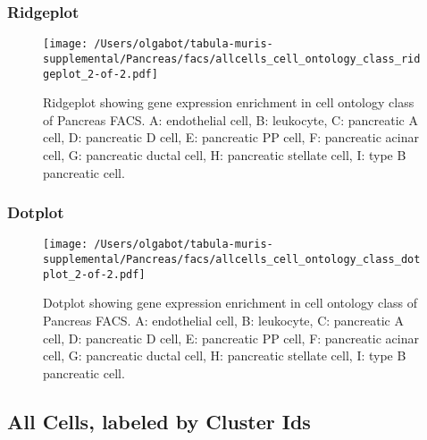\newpage
\newpage
\subsubsection{Ridgeplot}
\begin{figure}[h]
\centering
\texttt{[image: /Users/olgabot/tabula-muris-supplemental/Pancreas/facs/allcells\_cell\_ontology\_class\_ridgeplot\_2-of-2.pdf]}

\caption{ Ridgeplot  showing gene expression enrichment in cell ontology class of Pancreas FACS. A: endothelial cell, B: leukocyte, C: pancreatic A cell, D: pancreatic D cell, E: pancreatic PP cell, F: pancreatic acinar cell, G: pancreatic ductal cell, H: pancreatic stellate cell, I: type B pancreatic cell.}
\end{figure}


\newpage
\newpage
\subsubsection{Dotplot}
\begin{figure}[h]
\centering
\texttt{[image: /Users/olgabot/tabula-muris-supplemental/Pancreas/facs/allcells\_cell\_ontology\_class\_dotplot\_2-of-2.pdf]}

\caption{ Dotplot  showing gene expression enrichment in cell ontology class of Pancreas FACS. A: endothelial cell, B: leukocyte, C: pancreatic A cell, D: pancreatic D cell, E: pancreatic PP cell, F: pancreatic acinar cell, G: pancreatic ductal cell, H: pancreatic stellate cell, I: type B pancreatic cell.}
\end{figure}


\newpage
\subsection{All Cells, labeled by Cluster Ids}
